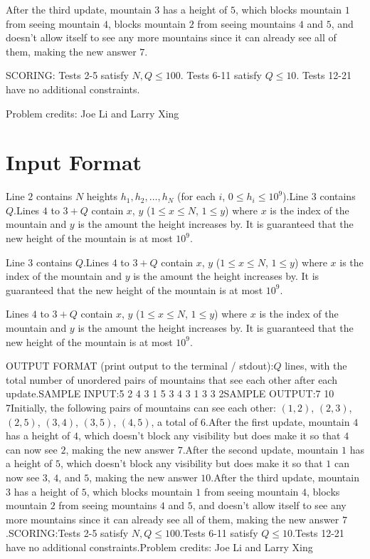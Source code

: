 \documentclass[12pt]{article}
\begin{document}
After the third update, mountain $3$ has a height of $5$, which blocks mountain
$1$ from seeing mountain $4$, blocks mountain $2$ from seeing mountains $4$ and
$5$, and doesn't allow itself to see any more mountains since it can already see
all of them, making the new answer
$7$.

SCORING:
 Tests 2-5 satisfy $N, Q\le 100$.
 Tests 6-11 satisfy $Q \leq 10$.  Tests 12-21 have no additional constraints. 


Problem credits: Joe Li and Larry Xing



\section*{Input Format}
Line $2$ contains $N$ heights $h_1,h_2,\dots,h_N$ (for each $i$,
$0 \leq h_i \leq 10^9$).Line $3$ contains $Q$.Lines $4$ to $3+Q$ contain $x$, $y$ ($1 \leq x \leq N$, $1 \leq y$) where $x$ is
the index of the mountain and $y$ is the amount the height increases by. It is
guaranteed that the new height of the mountain is at most $10^9$.

Line $3$ contains $Q$.Lines $4$ to $3+Q$ contain $x$, $y$ ($1 \leq x \leq N$, $1 \leq y$) where $x$ is
the index of the mountain and $y$ is the amount the height increases by. It is
guaranteed that the new height of the mountain is at most $10^9$.

Lines $4$ to $3+Q$ contain $x$, $y$ ($1 \leq x \leq N$, $1 \leq y$) where $x$ is
the index of the mountain and $y$ is the amount the height increases by. It is
guaranteed that the new height of the mountain is at most $10^9$.

OUTPUT FORMAT (print output to the terminal / stdout):$Q$ lines, with the total number of unordered pairs of mountains that see each
other after each update.SAMPLE INPUT:5
2 4 3 1 5
3
4 3
1 3
3 2SAMPLE OUTPUT:7
10
7Initially, the following pairs of mountains can see each other: $(1, 2)$,
$(2, 3)$, $(2, 5)$, $(3, 4)$, $(3, 5)$, $(4, 5)$, a total of $6$.After the first update, mountain $4$ has a height of $4$, which doesn't block
any visibility but does make it so that $4$ can now see $2$, making the new
answer $7$.After the second update, mountain $1$ has a height of $5$, which doesn't block
any visibility but does make it so that $1$ can now see $3$, $4$, and $5$,
making the new answer $10$.After the third update, mountain $3$ has a height of $5$, which blocks mountain
$1$ from seeing mountain $4$, blocks mountain $2$ from seeing mountains $4$ and
$5$, and doesn't allow itself to see any more mountains since it can already see
all of them, making the new answer
$7$.SCORING:Tests 2-5 satisfy $N, Q\le 100$.Tests 6-11 satisfy $Q \leq 10$.Tests 12-21 have no additional constraints.Problem credits: Joe Li and Larry Xing
\end{document}
